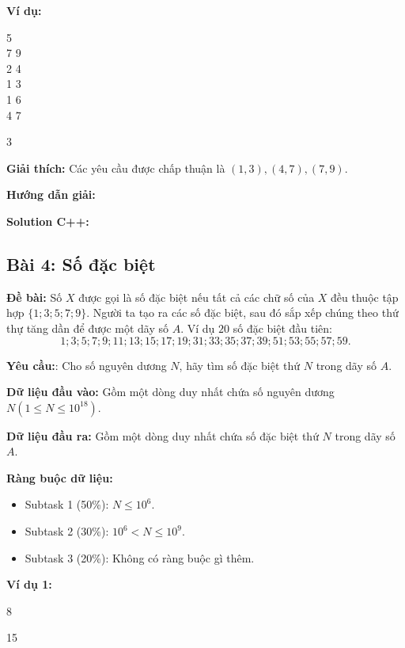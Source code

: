 \documentclass[12pt]{scrartcl}  %
\begin{document}
\textbf{Ví dụ:}
\begin{tcolorbox}[colback=gray!5!white, colframe=blue!50!black, title=Input]
5\\
7 9\\
2 4\\
1 3\\
1 6\\
4 7
\end{tcolorbox}
\begin{tcolorbox}[colback=gray!5!white, colframe=green!50!black, title=Output]
3
\end{tcolorbox}

\textbf{Giải thích:}
Các yêu cầu được chấp thuận là $(1, 3), (4, 7), (7, 9)$.

\textbf{Hướng dẫn giải:}

\textbf{Solution C++:}

\subsection{Bài 4: Số đặc biệt}

\textbf{Đề bài:}
Số $X$ được gọi là số đặc biệt nếu tất cả các chữ số của $X$ đều thuộc tập hợp $\{1; 3; 5; 7; 9\}$. Người ta tạo ra các số đặc biệt, sau đó sắp xếp chúng theo thứ thự tăng dần để được một dãy số $A$. 
Ví dụ $20$ số đặc biệt đầu tiên:
$$1; 3; 5; 7; 9; 11; 13; 15; 17; 19; 31; 33; 35; 37; 39; 51; 53; 55; 57; 59.$$

\textbf{Yêu cầu:}:
Cho số nguyên dương $N$, hãy tìm số đặc biệt thứ $N$ trong dãy số $A$.

\textbf{Dữ liệu đầu vào:}
Gồm một dòng duy nhất chứa số nguyên dương $N (1 \leq N \leq 10^{18})$. 

\textbf{Dữ liệu đầu ra:}
Gồm một dòng duy nhất chứa số đặc biệt thứ $N$ trong dãy số $A$.

\textbf{Ràng buộc dữ liệu:}
\begin{itemize}
    \item Subtask 1 (50\%): $N \leq 10^6$.
    \item Subtask 2 (30\%): $10^6 < N \leq 10^9$.
    \item Subtask 3 (20\%): Không có ràng buộc gì thêm.
\end{itemize}

\textbf{Ví dụ 1:}
\begin{tcolorbox}[colback=gray!5!white, colframe=blue!50!black, title=Input]
8
\end{tcolorbox}

\begin{tcolorbox}[colback=gray!5!white, colframe=green!50!black, title=Output]
15
\end{tcolorbox}
\end{document}
